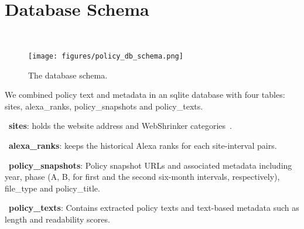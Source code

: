 \section{\\Database Schema}~\label{sec:db-schema}

\begin{figure*}[h]
\centering
\texttt{[image: figures/policy\_db\_schema.png]}
\caption{The database schema.}
\label{fig:db_schema}
\end{figure*}

We combined policy text and metadata in an sqlite database with four tables: 
sites, alexa\_ranks, policy\_snapshots and policy\_texts.

\begin{description}
\item~\textbf{sites}: holds the website address and WebShrinker categories~\cite{Webshrinker}.
\item~\textbf{alexa\_ranks}: keeps the historical Alexa ranks for each site-interval pairs.
\item~\textbf{policy\_snapshots}: Policy snapshot URLs and associated metadata including year, phase (A, B, for first and the second six-month intervals, respectively), file\_type and     policy\_title.
\item~\textbf{policy\_texts}: Contains extracted policy texts and text-based metadata such as length and readability scores.

\end{description}